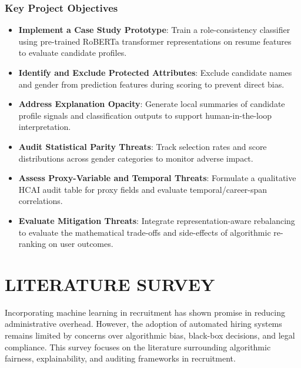 \documentclass[sigconf]{acmart}
\begin{document}
\subsubsection{Key Project Objectives}
\begin{itemize}
    \item \textbf{Implement a Case Study Prototype}: Train a role-consistency classifier using pre-trained RoBERTa transformer representations on resume features to evaluate candidate profiles.
    \item \textbf{Identify and Exclude Protected Attributes}: Exclude candidate names and gender from prediction features during scoring to prevent direct bias.
    \item \textbf{Address Explanation Opacity}: Generate local summaries of candidate profile signals and classification outputs to support human-in-the-loop interpretation.
    \item \textbf{Audit Statistical Parity Threats}: Track selection rates and score distributions across gender categories to monitor adverse impact.
    \item \textbf{Assess Proxy-Variable and Temporal Threats}: Formulate a qualitative HCAI audit table for proxy fields and evaluate temporal/career-span correlations.
    \item \textbf{Evaluate Mitigation Threats}: Integrate representation-aware rebalancing to evaluate the mathematical trade-offs and side-effects of algorithmic re-ranking on user outcomes.
\end{itemize}

\section{LITERATURE SURVEY}
Incorporating machine learning in recruitment has shown promise in reducing administrative overhead. However, the adoption of automated hiring systems remains limited by concerns over algorithmic bias, black-box decisions, and legal compliance. This survey focuses on the literature surrounding algorithmic fairness, explainability, and auditing frameworks in recruitment.
\end{document}
